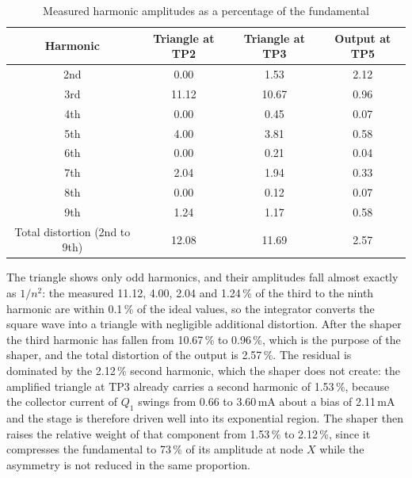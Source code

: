 \documentclass[12pt,a4paper]{article}
\begin{document}
	\begin{table}[H]
		\centering
		\caption{Measured harmonic amplitudes as a percentage of the fundamental}
		\label{tab:harmonics}
		\renewcommand{\arraystretch}{1.25}
		\begin{tabular}{|c|c|c|c|}
			\hline
			\rowcolor{black!12}\textbf{Harmonic} & \textbf{Triangle at TP2} & \textbf{Triangle at TP3} & \textbf{Output at TP5} \\
			\hline
			2nd & 0.00 & 1.53 & 2.12 \\
			\hline
			3rd & 11.12 & 10.67 & 0.96 \\
			\hline
			4th & 0.00 & 0.45 & 0.07 \\
			\hline
			5th & 4.00 & 3.81 & 0.58 \\
			\hline
			6th & 0.00 & 0.21 & 0.04 \\
			\hline
			7th & 2.04 & 1.94 & 0.33 \\
			\hline
			8th & 0.00 & 0.12 & 0.07 \\
			\hline
			9th & 1.24 & 1.17 & 0.58 \\
			\hline
			Total distortion (2nd to 9th) & 12.08 & 11.69 & 2.57 \\
			\hline
		\end{tabular}
	\end{table}

	The triangle shows only odd harmonics, and their amplitudes fall almost exactly as $1/n^2$: the measured 11.12, 4.00, 2.04 and 1.24\,\% of the third to the ninth harmonic are within 0.1\,\% of the ideal values, so the integrator converts the square wave into a triangle with negligible additional distortion. After the shaper the third harmonic has fallen from 10.67\,\% to 0.96\,\%, which is the purpose of the shaper, and the total distortion of the output is 2.57\,\%. The residual is dominated by the 2.12\,\% second harmonic, which the shaper does not create: the amplified triangle at TP3 already carries a second harmonic of 1.53\,\%, because the collector current of $Q_1$ swings from 0.66 to 3.60\,mA about a bias of 2.11\,mA and the stage is therefore driven well into its exponential region. The shaper then raises the relative weight of that component from 1.53\,\% to 2.12\,\%, since it compresses the fundamental to 73\,\% of its amplitude at node $X$ while the asymmetry is not reduced in the same proportion.

\end{document}
